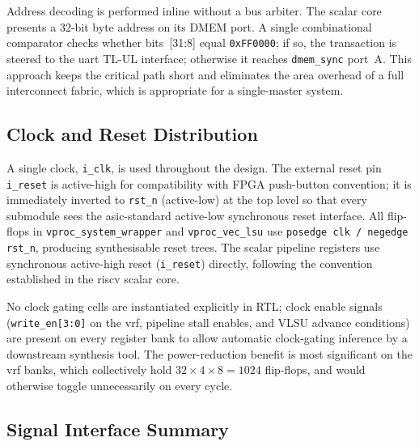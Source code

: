 Address decoding is performed inline without a bus arbiter. The scalar core presents
a 32-bit byte address on its DMEM port. A single combinational comparator checks
whether bits~[31:8] equal \texttt{0xFF0000}; if so, the transaction is steered to the
\gls{uart} TL-UL interface; otherwise it reaches \texttt{dmem\_sync} port~A. This
approach keeps the critical path short and eliminates the area overhead of a full
interconnect fabric, which is appropriate for a single-master system.

\subsection{Clock and Reset Distribution}
\label{subsec:clk_reset}

A single clock, \texttt{i\_clk}, is used throughout the design. The external reset pin
\texttt{i\_reset} is active-high for compatibility with FPGA push-button convention;
it is immediately inverted to \texttt{rst\_n} (active-low) at the top level so that
every submodule sees the \gls{asic}-standard active-low synchronous reset interface.
All flip-flops in \texttt{vproc\_system\_wrapper} and \texttt{vproc\_vec\_lsu} use
\texttt{posedge clk / negedge rst\_n}, producing synthesisable reset trees. The scalar
pipeline registers use synchronous active-high reset (\texttt{i\_reset}) directly,
following the convention established in the \gls{riscv} scalar core.

No clock gating cells are instantiated explicitly in RTL; clock enable signals
(\texttt{write\_en[3:0]} on the \gls{vrf}, pipeline stall enables, and VLSU advance
conditions) are present on every register bank to allow automatic clock-gating
inference by a downstream synthesis tool. The power-reduction benefit is most
significant on the \gls{vrf} banks, which collectively hold $32 \times 4 \times
8 = 1024$ flip-flops, and would otherwise toggle unnecessarily on every cycle.

\subsection{Signal Interface Summary}
\label{subsec:sig_table}

